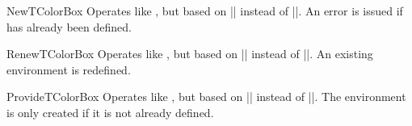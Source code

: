\clearpage
\begin{docCommand}{NewTColorBox}{}
  Operates like , but based on |\NewDocumentEnvironment| instead of |\DeclareDocumentEnvironment|.
  An error is issued if  has already been defined.
\end{docCommand}

\begin{docCommand}{RenewTColorBox}{}
  Operates like , but based on |\RenewDocumentEnvironment| instead of |\DeclareDocumentEnvironment|.
  An existing environment is redefined.
\end{docCommand}

\begin{docCommand}{ProvideTColorBox}{}
  Operates like , but based on |\ProvideDocumentEnvironment| instead of |\DeclareDocumentEnvironment|.
  The environment  is only created if it is not already defined.
\end{docCommand}


\clearpage

